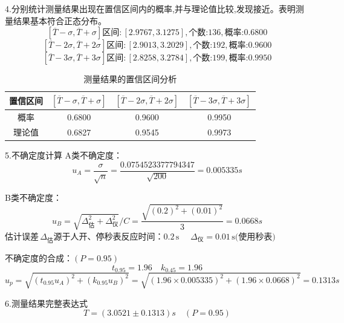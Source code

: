 \documentclass[12pt,a4paper]{article}
\begin{document}
	4.分别统计测量结果出现在置信区间内的概率,并与理论值比较,发现接近。表明测量结果基本符合正态分布。
	\[[\overline{T}-\sigma,\overline{T}+\sigma]\text{区间}: [2.9767, 3.1275], \text{个数:}136, \text{概率:}0.6800\]
	\[[\overline{T}-2\sigma,\overline{T}+2\sigma]\text{区间}: [2.9013, 3.2029], \text{个数:}192, \text{概率:}0.9600\]
	\[[\overline{T}-3\sigma,\overline{T}+3\sigma]\text{区间}: [2.8258, 3.2784], \text{个数:}199, \text{概率:}0.9950\]
	\begin{table}[h]
		\centering %
		\renewcommand{\arraystretch}{1.3} %
		\begin{tabular}{|c|c|c|c|}
			\hline
			置信区间 & $[\overline{T}-\sigma,\overline{T}+\sigma]$ & $[\overline{T}-2\sigma,\overline{T}+2\sigma]$ & $[\overline{T}-3\sigma,\overline{T}+3\sigma]$ \\ \hline
			概率 & 0.6800 & 0.9600 & 0.9950 \\ \hline
			理论值 & 0.6827 & 0.9545 & 0.9973 \\ \hline
		\end{tabular}
		\caption{测量结果的置信区间分析} %
		\label{tab:confidence_intervals} %
	\end{table}
	
	5.不确定度计算
	A类不确定度：
		$$u_{A}=\frac{\sigma}{\sqrt{n}}=\frac{0.0754523377794347}{\sqrt{200}}=0.005335s$$
	
	B类不确定度：
		\[u_B=\sqrt{\Delta_{\text{估}}^2+\Delta_{\text{仪}}^2}/C=\frac{\sqrt{(0.2)^{2}+(0.01)^{2}}}{3}=0.0668s\]
		$\text{估计误差}\,\Delta_{\text{估}}\text{源于人开、停秒表反应时间：}0.2\,\text{s}$
		$\quad \Delta_{\text{仪}} = 0.01\,\text{s}\text{(使用秒表)}$

	不确定度的合成：$(P=0.95)$
		$$t_{0.95}=1.96 \quad k_{0.45}=1.96$$
		$$u_{p}=\sqrt{(t_{0.95}u_{A})^{2}+(k_{0.95}u_{B})^{2}}=\sqrt{(1.96\times0.005335)^{2}+(1.96\times0.0668)^{2}}=0.1313s$$

	6.测量结果完整表达式
	$$T=(3.0521\pm0.1313)s\quad(P=0.95)$$
\end{document}
